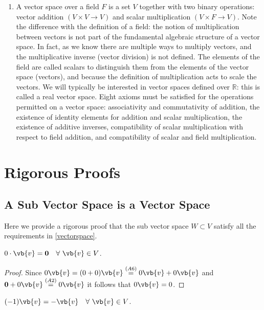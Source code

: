 \documentclass[a4paper,12pt]{report}
\begin{document}
\begin{appendices}
\begin{enumerate}
\item  A vector space over a field \( F \) is a set \( V \) together with two binary operations: vector addition \( (V \times V \to V) \) and scalar multiplication \( (V \times F \to V) \). Note the difference with the definition of a field: the notion of multiplication between vectors is not part of the fundamental algebraic structure of a vector space. In fact, as we know there are multiple ways to multiply vectors, and the multiplicative inverse (\ie  vector division) is not defined. The elements of the field are called scalars to distinguish them from the elements of the vector space (vectors), and because the definition of multiplication acts to scale the vectors. We will typically be interested in vector spaces defined over \( \mathbb{R} \): this is called a real vector space. Eight axioms must be satisfied for the operations permitted on a vector space: associativity and commutativity of addition, the existence of identity elements for addition and scalar multiplication, the existence of additive inverses, compatibility of scalar multiplication with respect to field addition, and compatibility of scalar and field multiplication.
\end{enumerate}

\chapter{Rigorous Proofs}

\section{A Sub Vector Space is a Vector Space} \label{subvectorvector} 

Here we provide a rigorous proof that the sub vector space \(W \subset V\) satisfy all the requirements in \cref{vectorspace}.
\begin{lemma}
    \(0 \cdot \vb{v} = \boldsymbol{0} ~~~ \forall ~ \vb{v} \in V\).  
\end{lemma}
    
\begin{proof}
    Since \(0\vb{v} = (0+0)\vb{v} \stackrel{(A6)}{=} 0\vb{v} + 0\vb{v} \) and \(\boldsymbol{0} + 0\vb{v} \stackrel{(A2)}{=}  0\vb{v}  \) it follows that \(0\vb{v} =0\).  
\end{proof}
    
\begin{lemma} 
        \((-1)\vb{v} = -\vb{v} ~~~ \forall ~\vb{v} \in V\). 
\end{lemma}
        

\end{appendices}
\end{document}
